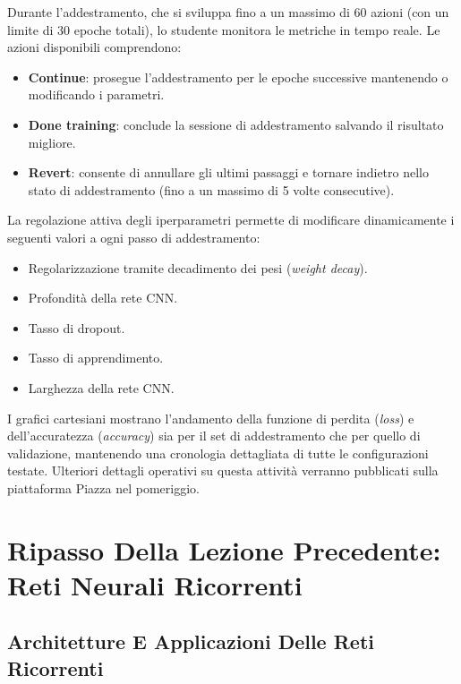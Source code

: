 ﻿\documentclass[11pt, a4paper]{article}
\begin{document}

Durante l'addestramento, che si sviluppa fino a un massimo di 60 azioni (con un limite di 30 epoche totali), lo studente monitora le metriche in tempo reale. Le azioni disponibili comprendono:
\begin{itemize}
    \item \textbf{Continue}: prosegue l'addestramento per le epoche successive mantenendo o modificando i parametri.
    \item \textbf{Done training}: conclude la sessione di addestramento salvando il risultato migliore.
    \item \textbf{Revert}: consente di annullare gli ultimi passaggi e tornare indietro nello stato di addestramento (fino a un massimo di 5 volte consecutive).
\end{itemize}

La regolazione attiva degli iperparametri permette di modificare dinamicamente i seguenti valori a ogni passo di addestramento:
\begin{itemize}
    \item Regolarizzazione tramite decadimento dei pesi (\emph{weight decay}).
    \item Profondità della rete CNN.
    \item Tasso di dropout.
    \item Tasso di apprendimento.
    \item Larghezza della rete CNN.
\end{itemize}

I grafici cartesiani mostrano l'andamento della funzione di perdita (\emph{loss}) e dell'accuratezza (\emph{accuracy}) sia per il set di addestramento che per quello di validazione, mantenendo una cronologia dettagliata di tutte le configurazioni testate. Ulteriori dettagli operativi su questa attività verranno pubblicati sulla piattaforma Piazza nel pomeriggio.

\newpage

\section{Ripasso Della Lezione Precedente: Reti Neurali Ricorrenti}

\subsection{Architetture E Applicazioni Delle Reti Ricorrenti}
\end{document}
